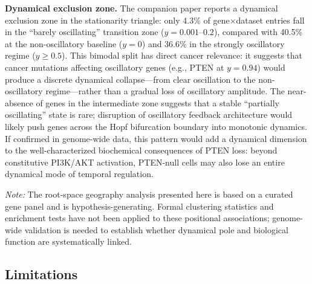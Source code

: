 \documentclass[11pt,letterpaper]{article}
\begin{document}
\textbf{Dynamical exclusion zone.} The companion paper \citep{whiteside2026paper1} reports a dynamical exclusion zone in the stationarity triangle: only 4.3\% of gene$\times$dataset entries fall in the ``barely oscillating'' transition zone ($y = 0.001$--$0.2$), compared with 40.5\% at the non-oscillatory baseline ($y = 0$) and 36.6\% in the strongly oscillatory regime ($y \geq 0.5$). This bimodal split has direct cancer relevance: it suggests that cancer mutations affecting oscillatory genes (e.g., PTEN at $y = 0.94$) would produce a discrete dynamical collapse---from clear oscillation to the non-oscillatory regime---rather than a gradual loss of oscillatory amplitude. The near-absence of genes in the intermediate zone suggests that a stable ``partially oscillating'' state is rare; disruption of oscillatory feedback architecture would likely push genes across the Hopf bifurcation boundary into monotonic dynamics. If confirmed in genome-wide data, this pattern would add a dynamical dimension to the well-characterized biochemical consequences of PTEN loss: beyond constitutive PI3K/AKT activation, PTEN-null cells may also lose an entire dynamical mode of temporal regulation.

\textit{Note:} The root-space geography analysis presented here is based on a curated gene panel and is hypothesis-generating. Formal clustering statistics and enrichment tests have not been applied to these positional associations; genome-wide validation is needed to establish whether dynamical pole and biological function are systematically linked.

\subsection{Limitations}
\end{document}
